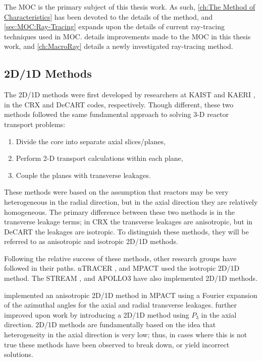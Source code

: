 {{{      The \ac{MOC} is the primary subject of this thesis work.
      As such, \cref{ch:The Method of Characteristics} has been devoted to the details of the method, and \cref{sec:MOC:Ray-Tracing} expands upon the details of current ray-tracing techniques used in \ac{MOC}.
       details improvements made to the \ac{MOC} in this thesis work, and \cref{ch:MacroRay} details a newly investigated ray-tracing method.
    }

    
    
    

    \subsection{2D/1D Methods}{\label{ssec:3T:2D/1D Methods}
      The 2D/1D methods were first developed by researchers at \ac{KAIST} \cite{Cho2002} and \ac{KAERI} \cite{DeCART}, in the CRX and DeCART codes, respectively.
      Though different, these two methods followed the same fundamental approach to solving 3-D reactor transport problems:
      \begin{enumerate}
        \item{Divide the core into separate axial slices/planes,}
        \item{Perform 2-D transport calculations within each plane,}
        \item{Couple the planes with transverse leakages.}
      \end{enumerate}
      These methods were based on the assumption that reactors may be very heterogeneous in the radial direction, but in the axial direction they are relatively homogeneous.
      The primary difference between these two methods is in the transverse leakage terms; in CRX the transverse leakages are anisotropic, but in DeCART the leakages are isotropic.
      To distinguish these methods, they will be referred to as anisotropic and isotropic 2D/1D methods.

      Following the relative success of these methods, other research groups have followed in their paths.
      nTRACER \cite{Jung2009}, and MPACT \cite{MPACT2016} used the isotropic 2D/1D method.
      The STREAM \cite{Zheng2017}, and APOLLO3 \cite{Faure2018} have also implemented 2D/1D methods.

      \citet{Stimpson2015} implemented an anisotropic 2D/1D method in MPACT using a Fourier expansion of the azimuthal angles for the axial and radial transverse leakages.
      \citet{Jarrett2018} further improved upon  work by introducing a 2D/1D method using $P_3$ in the axial direction.
      2D/1D methods are fundamentally based on the idea that heterogeneity in the axial direction is very low;
      thus, in cases where this is not true these methods have been observed to break down, or yield incorrect solutions.

}}}
